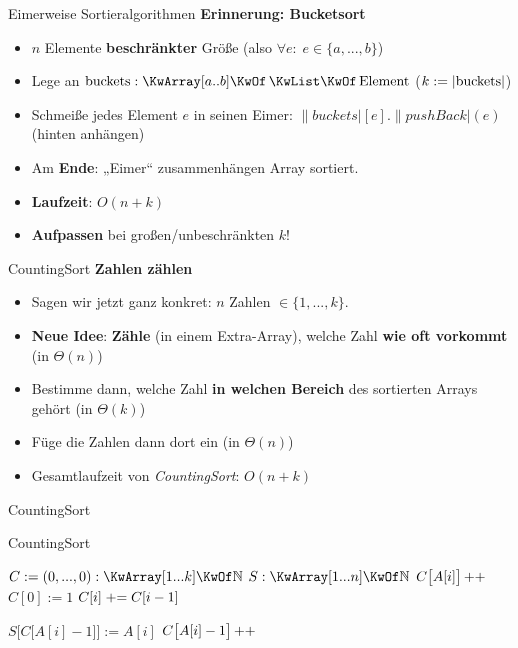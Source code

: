 \begin{frame}{Eimerweise Sortieralgorithmen}
	\textbf{Erinnerung: Bucketsort} 
	\begin{itemize}
		\item $n$ Elemente \textbf{beschränkter} Größe (also $\forall e : \; e \in \{a, ..., b\} $)
		\item Lege an \: $\|buckets|: \KwArray[a..b] \KwOf \KwListOf \|Element|$ \quad ($k := \abs{\|buckets|}$)
		\item Schmeiße jedes Element $e$ in seinen Eimer: $\|buckets|[e].\|pushBack|(e)$ (hinten anhängen)
		\item Am \textbf{Ende}: „Eimer“ zusammenhängen
		\implitem Array sortiert. 
		\item \textbf{Laufzeit}: $O(n+k)$
		\item \textbf{Aufpassen} bei großen/unbeschränkten $k$!
	\end{itemize}
\end{frame}

\begin{frame}{CountingSort}
	\textbf{Zahlen zählen} 
	\begin{itemize}
		\item Sagen wir jetzt ganz konkret: $n$ Zahlen $\in \{1,...,k\}$.
		\pause
		\item \textbf{Neue Idee}: \textbf{Zähle} (in einem Extra-Array), welche Zahl \textbf{wie oft vorkommt} (in $\Theta(n)$)
		\pause
		\item Bestimme dann, welche Zahl \textbf{in welchen Bereich} des sortierten Arrays gehört (in $\Theta(k)$)
		\pause
		\item Füge die Zahlen dann dort ein (in $\Theta(n)$)
		\pause
		\item Gesamtlaufzeit von \emph{CountingSort}: $O(n + k)$
	\end{itemize}
\end{frame}

\begin{frame}{CountingSort}
	\begin{exampleblock}{CountingSort}
		\begin{algorithm}[H]
			\small
			 {
				$C := (0,...,0) : \KwArray[1...k] \KwOf \N$  \;
				$S : \KwArray[1...n] \KwOf \N$  \;
				 {
					$C\big[A[i]\big]\operatorname{++}$\;
				}
				$C[0] := 1$\;
				 {
					$C[i] \mathrel{+}= C[i-1]$\;
				}
				
				 {
					$S\Big[C\big[A[i]-1\big]\Big] := A[i]$   \;
					$C\big[A[i]-1\big]\operatorname{++}$ 
				}
			}
		\end{algorithm}
	\end{exampleblock}
\end{frame}

